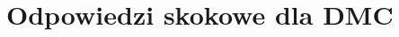 
\chapter{Odpowiedzi skokowe dla DMC}

\begin{figure}[H]
\centering

\caption{}
\end{figure}

%

\begin{figure}[H]
\centering

\caption{}
\end{figure}

\begin{figure}[H]
\centering

\caption{}
\end{figure}